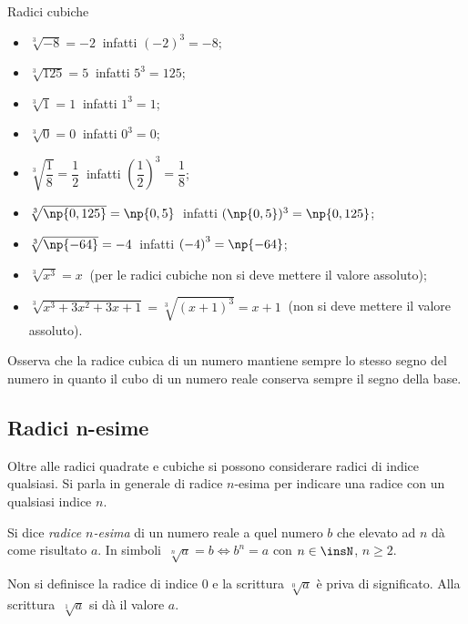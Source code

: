 \begin{exrig}
\begin{esempio}
Radici cubiche
 \begin{multicols}{2}
 \begin{itemize}
\item $\sqrt[3]{-8}=-2\:$ infatti $\left(-2\right)^3=-8$;
\item $\sqrt[3]{125}=5\:$ infatti $5^3=125$;
\item $\sqrt[3]{1}=1\:$ infatti $1^3=1$;
\item $\sqrt[3]{0}=0\:$ infatti $0^3=0$;
\item $\sqrt[3]{\dfrac{1}{8}}=\dfrac{1}{2}\:$ infatti $\left(\dfrac{1}{2}\right)^3=\dfrac{1}{8}$;
\item $\sqrt[3]{\np{0,125}}=\np{0,5}\:$ infatti $(\np{0,5})^3=\np{0,125}$;
\item $\sqrt[3]{\np{-64}}=-4\:$ infatti $\left(-4\right)^3=\np{-64}$;
\item $\sqrt[3]{x^3}=x\:$ (per le radici cubiche non si deve mettere il valore assoluto);
\item $\sqrt[3]{x^3+3x^2+3x+1}=\sqrt[3]{(x+1)^3}=x+1\:$ (non si deve mettere il valore assoluto).
\end{itemize}
\end{multicols}
\end{esempio}
\end{exrig}

Osserva che la radice cubica di un numero mantiene sempre lo stesso segno del numero in quanto il cubo di un numero reale conserva sempre il segno della base.

\subsection{Radici n-esime}

Oltre alle radici quadrate e cubiche si possono considerare radici di indice qualsiasi. Si parla in generale di radice $n$-esima per indicare una radice con un qualsiasi indice $n$.

\begin{definizione}
Si dice \emph{radice $n$-esima} di un numero reale a quel numero $b$ che elevato ad $n$ dà come risultato $a$.
In simboli~$\sqrt[n]{a}=b \Leftrightarrow b^n=a$ con $n\in \insN$, $n\ge 2$.

Non si definisce la radice di indice $0$ e la scrittura $\sqrt[0]{a}$ è priva di significato. Alla scrittura~$\sqrt[1]{a}$ si dà il valore $a$.
\end{definizione}

